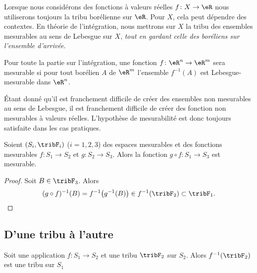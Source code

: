 \begin{remark}
    Lorsque nous considérons des fonctions à valeurs réelles \( f\colon X\to \eR\) nous utiliserons toujours la tribu borélienne sur \( \eR\). Pour \( X\), cela peut dépendre des contextes. En théorie de l'intégration, nous mettrons sur \( X\) la tribu des ensembles mesurables au sens de Lebesgue sur \( X\), \emph{tout en gardant celle des boréliens sur l'ensemble d'arrivée}.

    Pour toute la partie sur l'intégration, une fonction \( f\colon \eR^n\to \eR^m\) sera mesurable si pour tout borélien \( A\) de \( \eR^m\) l'ensemble \( f^{-1}(A)\) est Lebesgue-mesurable dans \( \eR^n\).

    Étant donné qu'il est franchement difficile de créer des ensembles non mesurables au sens de Lebesgue, il est franchement difficile de créer des fonction non mesurables à valeurs réelles. L'hypothèse de mesurabilité est donc toujours satisfaite dans les cas pratiques.
\end{remark}

\begin{proposition}
    Soient \( (S_i,\tribF_i)\) (\( i=1,2,3\)) des espaces mesurables et des fonctions mesurables \( f\colon S_1\to S_2\) et \( g\colon S_2\to S_3\). Alors la fonction \( g\circ f\colon S_1\to S_3\) est mesurable.
\end{proposition}

\begin{proof}
    Soit \( B\in\tribF_3\). Alors
    \begin{equation}
        (g\circ f)^{-1}(B)=f^{-1}\big( g^{-1}(B) \big)\in f^{-1}(\tribF_2)\subset\tribF_1.
    \end{equation}
\end{proof}

\subsection{D'une tribu à l'autre}


\begin{lemma}       \label{LemooVDXJooZNYelH}
    Soit une application \( f\colon S_1\to S_2\) et une tribu \( \tribF_2\) sur \( S_2\). Alors \( f^{-1}(\tribF_2)\) est une tribu sur \( S_1\)
\end{lemma}

